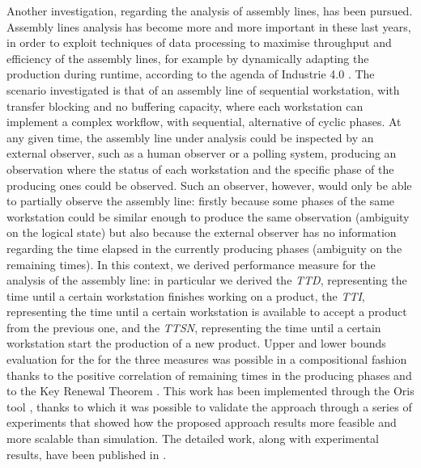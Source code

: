   Another investigation, regarding the analysis of assembly lines, has been pursued. Assembly lines analysis has become more and more important in these last years, in order to exploit techniques of data processing to maximise throughput and efficiency of the assembly lines, for example by dynamically adapting the production during runtime, according to the agenda of Industrie 4.0 \cite{hermann2016design}. The scenario investigated is that of an assembly line of sequential workstation, with transfer blocking and no buffering capacity, where each workstation can implement a complex workflow, with sequential, alternative of cyclic phases. At any given time, the assembly line under analysis could be inspected by an external observer, such as a human observer or a polling system, producing an observation where the status of each workstation and the specific phase of the producing ones could be observed. Such an observer, however, would only be able to partially observe the assembly line: firstly because some phases of the same workstation could be similar enough to produce the same observation (ambiguity on the logical state) but also because the external observer has no information regarding the time elapsed in the currently producing phases (ambiguity on the remaining times). In this context, we derived performance measure for the analysis of the assembly line: in particular we derived the \textit{\ac{TTD}}, representing the time until a certain workstation finishes working on a product, the \textit{\ac{TTI}}, representing the time until a certain workstation is available to accept a product from the previous one, and the \textit{\ac{TTSN}}, representing the time until a certain workstation start the production of a new product. Upper and lower bounds evaluation for the  for the three measures was possible in a compositional fashion thanks to the positive correlation of remaining times in the producing phases and to the Key Renewal Theorem \cite{serfozo2009basics}. This work has been implemented through the Oris tool , thanks to which it was possible to validate the approach through a series of experiments that showed how the proposed approach results more feasible and more scalable than simulation. The detailed work, along with experimental results, have been published in \cite{biagi2017inspection}.
  
